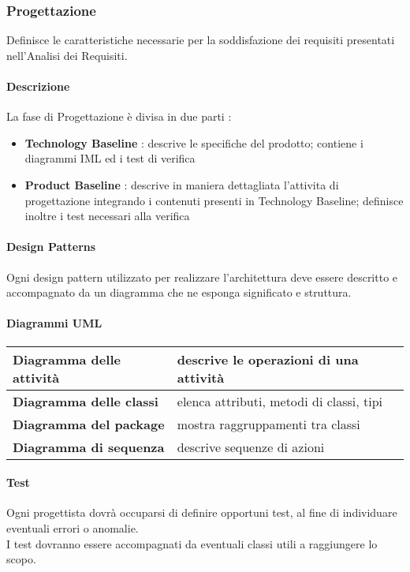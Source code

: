 		\subsubsection{Progettazione} 
			Definisce le caratteristiche necessarie per la soddisfazione dei requisiti presentati nell'Analisi dei Requisiti.
			
			\paragraph{Descrizione} \hfill \break
				La fase di Progettazione è divisa in due parti :
				\begin{itemize}
					\item \textbf{Technology Baseline} : descrive le specifiche del prodotto; contiene i diagrammi IML ed i test di verifica
					\item \textbf{Product Baseline} : descrive in maniera dettagliata l'attivita di progettazione integrando i contenuti presenti in Technology Baseline; definisce inoltre i test necessari alla verifica
				\end{itemize} 	
			
			\paragraph{Design Patterns} \hfill \break
				Ogni design pattern utilizzato per realizzare l'architettura deve essere descritto e accompagnato da un diagramma che ne esponga significato e struttura.
				
			\paragraph{Diagrammi UML} \hfill \break
				\begin{tabular}{ |m{15em}|m{25em}| }
					\hline
					\textbf{Diagramma delle attività}	& descrive le operazioni di una attività \\
					\hline
					\textbf{Diagramma delle classi}		& elenca attributi, metodi di classi, tipi \\
					\hline
					\textbf{Diagramma del package}		& mostra raggruppamenti tra classi  \\
					\hline
					\textbf{Diagramma di sequenza} 		& descrive sequenze di azioni  \\
					\hline
				\end{tabular}
			
			\paragraph{Test} \hfill \break
				Ogni progettista dovrà occuparsi di definire opportuni test, al fine di individuare eventuali errori o anomalie. \\
				I test dovranno essere accompagnati da eventuali classi utili a raggiungere lo scopo.
			
